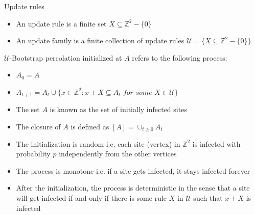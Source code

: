 \begin{frame}{Update rules}
    
    \begin{itemize}
        \item An update rule is a finite set $X\subseteq\mathbb{Z}^2-\{0\}$
        \item An update family is a finite collection of update rules $\mathscr{U}=\{X\subseteq\mathbb{Z}^2-\{0\}\}$
    \end{itemize}
    
 
\begin{block}{}
   
 $\mathscr{U}$-Bootstrap percolation initialized at $A$ refers to the following process:

 \begin{itemize}
     \item $A_0=A$
     \item $A_{t+1}=A_t\cup \{x\in\mathbb{Z}^2: x+X\subseteq A_t \textit{ for some } X\in\mathscr{U}\}$
 \end{itemize}
 \end{block}
 
 \end{frame}
 \begin{frame}

 \begin{itemize}
 
 
     \item The set $A$ is known as the set of initially infected sites
     \item The closure of $A$ is defined as $[A]=\cup_{t\geq 0} A_t$
     \item The initialization is random i.e. each site (vertex)
     in $\mathbb{Z}^2$ is infected with probability $p$ independently from the other vertices
     \item The process is monotone i.e. if a site gets infected, it stays infected forever
     \item After the initialization, the process is deterministic in the sense that a site will get infected if and only if there is some rule $X$ in $\mathscr{U}$ such that $x+X$ is infected
 \end{itemize}
 


\end{frame}




